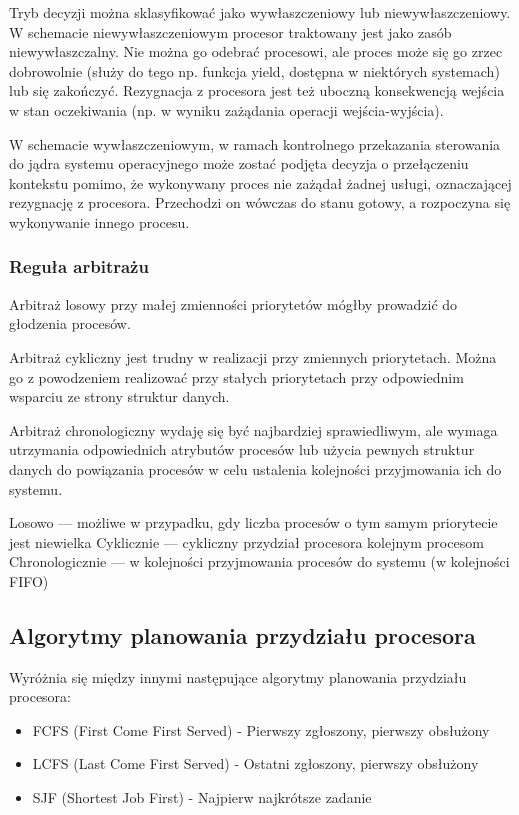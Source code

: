 \documentclass[12pt]{article}
\begin{document}
    Tryb decyzji można sklasyfikować jako wywłaszczeniowy lub niewywłaszczeniowy.
    W schemacie niewywłaszczeniowym procesor traktowany jest jako zasób niewywłaszczalny. Nie można go odebrać procesowi, ale proces może się go zrzec dobrowolnie (służy do tego np. funkcja yield, dostępna w niektórych systemach) lub się zakończyć. Rezygnacja z procesora jest też uboczną konsekwencją wejścia w stan oczekiwania (np. w wyniku zażądania operacji wejścia-wyjścia).
    
    W schemacie wywłaszczeniowym, w ramach kontrolnego przekazania sterowania do jądra systemu operacyjnego może zostać podjęta decyzja o przełączeniu kontekstu pomimo, że wykonywany proces nie zażądał żadnej usługi, oznaczającej rezygnację z procesora. Przechodzi on wówczas do stanu gotowy, a rozpoczyna się wykonywanie innego procesu.
    
    \subsubsection{Reguła arbitrażu}
    
    Arbitraż losowy przy małej zmienności priorytetów mógłby prowadzić do głodzenia procesów.

    Arbitraż cykliczny jest trudny w realizacji przy zmiennych priorytetach. Można go z powodzeniem realizować przy stałych priorytetach przy odpowiednim wsparciu ze strony struktur danych.
    
    Arbitraż chronologiczny wydaję się być najbardziej sprawiedliwym, ale wymaga utrzymania odpowiednich atrybutów procesów lub użycia pewnych struktur danych do powiązania procesów w celu ustalenia kolejności przyjmowania ich do systemu.
    
    Losowo — możliwe w przypadku, gdy liczba procesów o tym samym priorytecie jest niewielka
    Cyklicznie — cykliczny przydział procesora kolejnym procesom
    Chronologicznie — w kolejności przyjmowania procesów do systemu (w kolejności FIFO)

    \subsection{Algorytmy planowania przydziału procesora}
    
    Wyróżnia się między innymi następujące algorytmy planowania przydziału procesora:
    \begin{itemize}
        \item FCFS (First Come First Served) - Pierwszy zgłoszony, pierwszy obsłużony
        \item LCFS (Last Come First Served) - Ostatni zgłoszony, pierwszy obsłużony
        \item SJF (Shortest Job First) - Najpierw najkrótsze zadanie
    \end{itemize}
    
\end{document}

